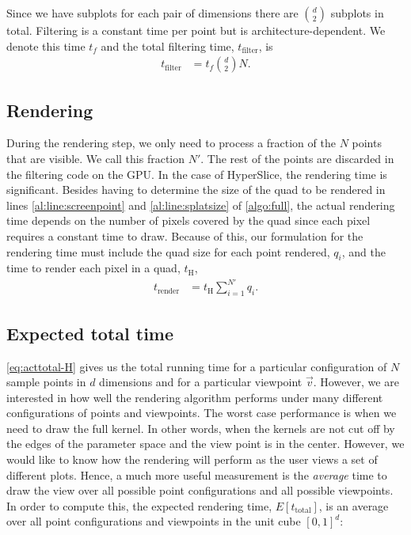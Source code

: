 Since we have subplots for each pair of dimensions there are
${d \choose 2}$ subplots in total. Filtering is a constant time per point
but is
architecture-dependent. We denote this time $t_f$ and the total 
filtering time, $t_\text{filter}$, is
\begin{align}
  t_\text{filter} &= t_f {d \choose 2} N \text{.}
\end{align}

\subsection{Rendering}
\label{rendering}

During the rendering step, we only need to process a fraction of the $N$ points
that are visible. We call this fraction $N'$. 
The rest of the points are discarded in the filtering
code on the GPU. In the case of HyperSlice,
the rendering time is significant. Besides having to determine the size of the
quad to be rendered in lines \autoref{al:line:screenpoint} and 
\autoref{al:line:splatsize} of \autoref{algo:full}, the actual rendering
time depends on the number of pixels covered by the quad since each pixel 
requires a constant time to draw. 
Because of this, our formulation for the 
rendering time 
must include the quad size for each point rendered, $q_i$, and
the time to render each pixel in a quad, $t_\text{H}$,
\begin{align}
  t_\text{render} &= t_\text{H} \sum_{i=1}^{N'} q_i \text{.}
\end{align}

\subsection{Expected total time}
\label{sec:expectedtotaltime}

\autoref{eq:acttotal-H} gives us the total running time for a
particular configuration of $N$ sample points in $d$ dimensions and for a particular
viewpoint $\vec{v}$. However, we are interested in how well the rendering
algorithm performs under many different configurations of points and 
viewpoints. 
The worst case performance is when we need to draw the full kernel.
In other words, when the kernels are not cut off by the edges
of the parameter space and the view point is in the center.
However, we would like to know how the rendering will
perform as the user views a set of different plots.
Hence, a much more
useful measurement is the \emph{average} time to draw the 
view over all possible point configurations and all
possible viewpoints.
In order to compute this, the expected rendering
time, $E[t_\text{total}]$, is an
average over all point configurations and viewpoints in the unit
cube $[0,1]^d$:


